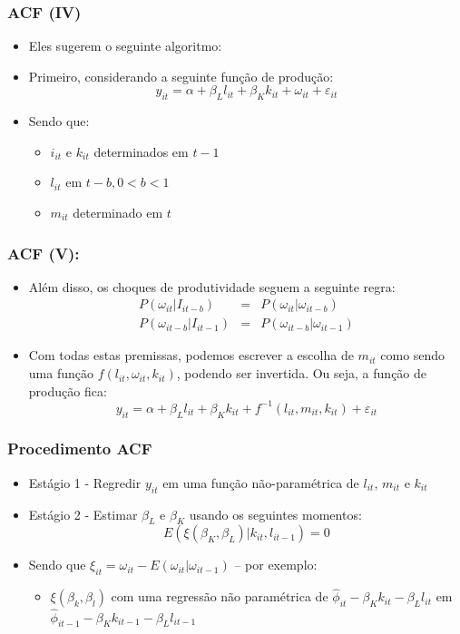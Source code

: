 \documentclass{beamer}
\begin{document}
\begin{frame}\frametitle{ACF (IV)}

\begin{itemize}
\item Eles sugerem o seguinte algoritmo:
\item Primeiro, considerando a seguinte função de produção:
\[
y_{it}=\alpha+\beta_{L}l_{it}+\beta_{K}k_{it}+\omega_{it}+\varepsilon_{it}
\]
\item Sendo que:

\begin{itemize}
\item $i_{it}$ e $k_{it}$ determinados em $t-1$
\item $l_{it}$ em $t-b,0<b<1$
\item $m_{it}$ determinado em $t$
\end{itemize}
\end{itemize}
\end{frame}

\begin{frame}\frametitle{ACF (V):}

\begin{itemize}
\item Além disso, os choques de produtividade seguem a seguinte regra:
\begin{eqnarray*}
P(\omega_{it}|I_{it-b}) & = & P(\omega_{it}|\omega_{it-b})\\
P(\omega_{it-b}|I_{it-1}) & = & P(\omega_{it-b}|\omega_{it-1})
\end{eqnarray*}
\item Com todas estas premissas, podemos escrever a escolha de $m_{it}$
como sendo uma função $f(l_{it},\omega_{it},k_{it})$, podendo ser
invertida. Ou seja, a função de produção fica:
\[
y_{it}=\alpha+\beta_{L}l_{it}+\beta_{K}k_{it}+f^{-1}(l_{it},m_{it},k_{it})+\varepsilon_{it}
\]
\end{itemize}
\end{frame}

\begin{frame}\frametitle{Procedimento ACF}

\begin{itemize}
\item Estágio 1 - Regredir $y_{it}$ em uma função não-paramétrica de $l_{it}$,
$m_{it}$ e $k_{it}$
\item Estágio 2 - Estimar $\beta_{L}$ e $\beta_{K}$ usando os seguintes
momentos:
\[
E(\xi(\beta_{K},\beta_{L})|k_{it},l_{it-1})=0
\]
\item Sendo que $\xi_{it}=\omega_{it}-E(\omega_{it}|\omega_{it-1})$ --
por exemplo:

\begin{itemize}
\item $\xi(\beta_{k},\beta_{l})$ com uma regressão não paramétrica de $\hat{\phi}_{it}-\beta_{K}k_{it}-\beta_{L}l_{it}$
em $\hat{\phi}_{it-1}-\beta_{K}k_{it-1}-\beta_{L}l_{it-1}$ 
\end{itemize}
\end{itemize}
\end{frame}
\end{document}
